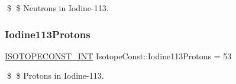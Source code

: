 \$ \$ Neutrons in Iodine-\/113. \mbox{\label{group___isotope_const-_iodine-_i113_ga080ba384589a9963c89fa3728aee13bb}} 
\subsubsection{\texorpdfstring{Iodine113\+Protons}{Iodine113Protons}}
{\footnotesize\ttfamily \mbox{\hyperlink{group___isotope_const-_macros_ga5f18360b3e99483a35c32d789e62621c}{I\+S\+O\+T\+O\+P\+E\+C\+O\+N\+S\+T\+\_\+\+I\+NT}} Isotope\+Const\+::\+Iodine113\+Protons = 53}

\$ \$ Protons in Iodine-\/113. 